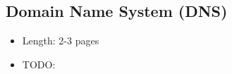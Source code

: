 \subsection{Domain Name System (DNS)}

\begin{itemize}
  \item Length: 2-3 pages
  \item TODO:
\end{itemize}

